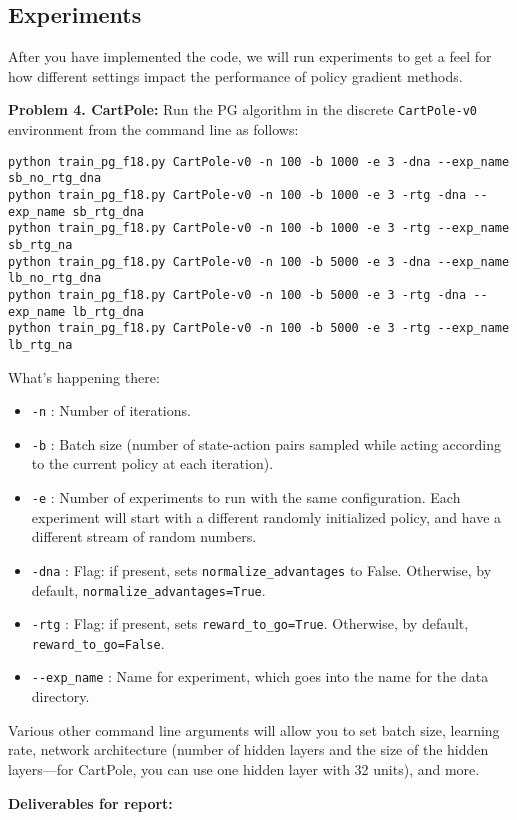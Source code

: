 \documentclass[12pt]{article}
\begin{document}
\subsection{Experiments}
After you have implemented the code, we will run experiments to get a feel for how different settings impact the performance of policy gradient methods.

\textbf{Problem 4. CartPole:} Run the PG algorithm in the discrete \verb|CartPole-v0| environment from the command line as follows:
\begin{lstlisting}
python train_pg_f18.py CartPole-v0 -n 100 -b 1000 -e 3 -dna --exp_name sb_no_rtg_dna
python train_pg_f18.py CartPole-v0 -n 100 -b 1000 -e 3 -rtg -dna --exp_name sb_rtg_dna
python train_pg_f18.py CartPole-v0 -n 100 -b 1000 -e 3 -rtg --exp_name sb_rtg_na
python train_pg_f18.py CartPole-v0 -n 100 -b 5000 -e 3 -dna --exp_name lb_no_rtg_dna
python train_pg_f18.py CartPole-v0 -n 100 -b 5000 -e 3 -rtg -dna --exp_name lb_rtg_dna
python train_pg_f18.py CartPole-v0 -n 100 -b 5000 -e 3 -rtg --exp_name lb_rtg_na
\end{lstlisting}

What's happening there:
\begin{itemize}
\item \verb|-n| : Number of iterations.
\item \verb|-b| : Batch size (number of state-action pairs sampled while acting according to the current policy at each iteration).
\item \verb|-e| : Number of experiments to run with the same configuration. Each experiment will start with a different randomly initialized policy, and have a different stream of random numbers. 
\item \verb|-dna| : Flag: if present, sets \verb|normalize_advantages| to False. Otherwise, by default, \verb|normalize_advantages=True|. 
\item \verb|-rtg| : Flag: if present, sets \verb|reward_to_go=True|. Otherwise, by default, \verb|reward_to_go=False|. 
\item \verb|--exp_name| : Name for experiment, which goes into the name for the data directory.
\end{itemize}

Various other command line arguments will allow you to set batch size, learning rate, network architecture (number of hidden layers and the size of the hidden layers---for CartPole, you can use one hidden layer with 32 units), and more. 

\textbf{Deliverables for report:}
\end{document}
